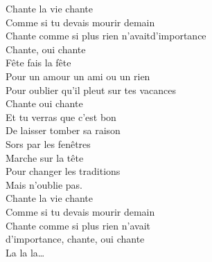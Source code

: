 \documentclass{novel}
\begin{document}
{\begin{minipage}[t][0.65\textheight][t]{\textwidth}
\begin{multicols}{2}
Chante la vie chante \\
Comme si tu devais mourir demain \\
Chante comme si plus rien n'avaitd'importance \\
Chante, oui chante \\
Fête fais la fête \\
Pour un amour un ami ou un rien \\
Pour oublier qu'il pleut sur tes vacances \\
Chante oui chante \\
Et tu verras que c'est bon \\
De laisser tomber sa raison \\
Sors par les fenêtres \\
Marche sur la tête \\
Pour changer les traditions \\
Mais n'oublie pas. \\

Chante la vie chante \\
Comme si tu devais mourir demain \\
Chante comme si plus rien n'avait \\
d'importance, chante, oui chante \\
La la la… 

\end{multicols}
\end{minipage}
}
\end{document}
